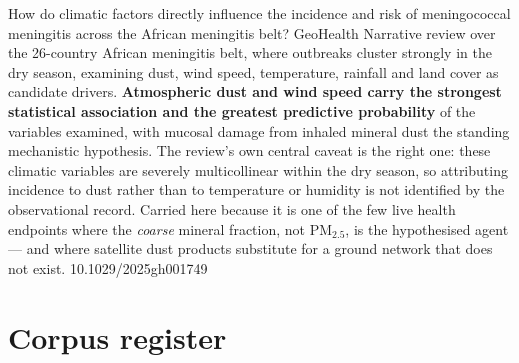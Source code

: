 \documentclass[10pt]{article}
\begin{document}
{How do climatic factors directly influence the incidence and risk of meningococcal
meningitis across the African meningitis belt?}
{GeoHealth}
{Narrative review over the 26-country African meningitis belt, where outbreaks cluster
strongly in the dry season, examining dust, wind speed, temperature, rainfall and land
cover as candidate drivers. \textbf{Atmospheric dust and wind speed carry the strongest
statistical association and the greatest predictive probability} of the variables
examined, with mucosal damage from inhaled mineral dust the standing mechanistic
hypothesis. The review's own central caveat is the right one: these climatic variables are
severely multicollinear within the dry season, so attributing incidence to dust rather
than to temperature or humidity is not identified by the observational record. Carried
here because it is one of the few live health endpoints where the \emph{coarse} mineral
fraction, not PM$_{2.5}$, is the hypothesised agent --- and where satellite dust products
substitute for a ground network that does not exist.}
{10.1029/2025gh001749}

\clearpage

\section*{\sffamily\bfseries\color{Deep}Corpus register}
\vspace{-1.5mm}{\color{Amber}\rule{\linewidth}{1.1pt}}\vspace{2.5mm}


\end{document}
